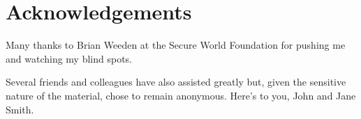 \section*{Acknowledgements}

Many thanks to Brian Weeden at the Secure World Foundation for pushing
me and watching my blind spots.

Several friends and colleagues have also assisted greatly but, given
the sensitive nature of the material, chose to remain anonymous.
Here's to you, John and Jane Smith.
